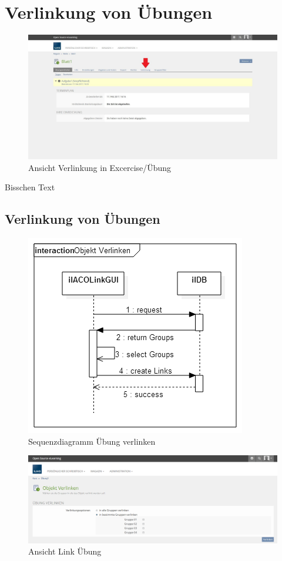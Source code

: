 \chapter{Verlinkung von Übungen}\label{linkUebung}
\begin{figure}[h!]
	\centering
	\includegraphics[width=1\textwidth]{img/excercise.jpg}
	\caption{Ansicht Verlinkung in Excercise/Übung}
\end{figure}

Bisschen Text 
\newpage

\section{Verlinkung von Übungen}
\begin{figure}[h!]
	\centering
	\includegraphics[width=.7\textwidth]{img/seq_linkGUI.png}
	\caption{Sequenzdiagramm Übung verlinken}
\end{figure}

\begin{figure}[h!]
	\centering
	\includegraphics[width=1\textwidth]{img/linkUebung.png}
	\caption{Ansicht Link Übung}
\end{figure}

